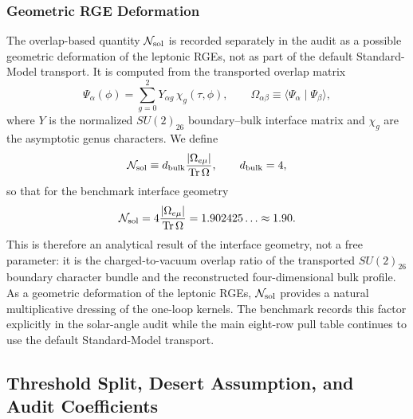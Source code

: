 \documentclass[11pt]{article}
\renewcommand{\Tr}{\operatorname{Tr}}
\begin{document}
\subsubsection*{Geometric RGE Deformation}

The overlap-based quantity $\mathcal N_{\rm sol}$ is recorded separately in the audit as a possible geometric deformation of the leptonic RGEs, not as part of the default Standard-Model transport. It is computed from the transported overlap matrix
\begin{equation}
 \Psi_{\alpha}(\phi)=\sum_{g=0}^{2}Y_{\alpha g}\,\chi_g(\tau,\phi),
 \qquad
 \Omega_{\alpha\beta}\equiv\langle\Psi_{\alpha}\mid\Psi_{\beta}\rangle,
\end{equation}
where $Y$ is the normalized $SU(2)_{26}$ boundary--bulk interface matrix and $\chi_g$ are the asymptotic genus characters. We define
\begin{equation}
 \mathcal N_{\rm sol}
 \equiv
 d_{\rm bulk}\frac{|\Omega_{e\mu}|}{\Tr\Omega},
 \qquad
 d_{\rm bulk}=4,
\end{equation}
so that for the benchmark interface geometry
\begin{equation}
 \mathcal N_{\rm sol}
 =
 4\frac{|\Omega_{e\mu}|}{\Tr\Omega}
 =1.902425\ldots\approx1.90.
\end{equation}
This is therefore an analytical result of the interface geometry, not a free parameter: it is the charged-to-vacuum overlap ratio of the transported $SU(2)_{26}$ boundary character bundle and the reconstructed four-dimensional bulk profile. As a geometric deformation of the leptonic RGEs, $\mathcal N_{\rm sol}$ provides a natural multiplicative dressing of the one-loop kernels. The benchmark records this factor explicitly in the solar-angle audit while the main eight-row pull table continues to use the default Standard-Model transport.

\subsection{Threshold Split, Desert Assumption, and Audit Coefficients}
\end{document}
